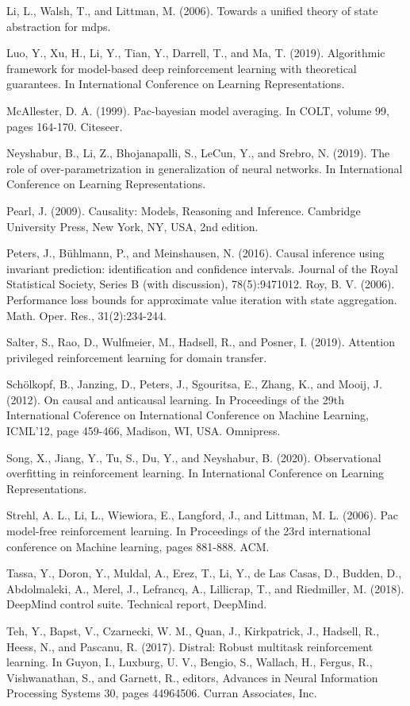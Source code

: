 \documentclass[10pt]{article}
\begin{document}
Li, L., Walsh, T., and Littman, M. (2006). Towards a unified theory of state abstraction for mdps.

Luo, Y., Xu, H., Li, Y., Tian, Y., Darrell, T., and Ma, T. (2019). Algorithmic framework for model-based deep reinforcement learning with theoretical guarantees. In International Conference on Learning Representations.

McAllester, D. A. (1999). Pac-bayesian model averaging. In COLT, volume 99, pages 164-170. Citeseer.

Neyshabur, B., Li, Z., Bhojanapalli, S., LeCun, Y., and Srebro, N. (2019). The role of over-parametrization in generalization of neural networks. In International Conference on Learning Representations.

Pearl, J. (2009). Causality: Models, Reasoning and Inference. Cambridge University Press, New York, NY, USA, 2nd edition.

Peters, J., Bühlmann, P., and Meinshausen, N. (2016). Causal inference using invariant prediction: identification and confidence intervals. Journal of the Royal Statistical Society, Series B (with discussion), 78(5):9471012. Roy, B. V. (2006). Performance loss bounds for approximate value iteration with state aggregation. Math. Oper. Res., 31(2):234-244.

Salter, S., Rao, D., Wulfmeier, M., Hadsell, R., and Posner, I. (2019). Attention privileged reinforcement learning for domain transfer.

Schölkopf, B., Janzing, D., Peters, J., Sgouritsa, E., Zhang, K., and Mooij, J. (2012). On causal and anticausal learning. In Proceedings of the 29th International Coference on International Conference on Machine Learning, ICML'12, page 459-466, Madison, WI, USA. Omnipress.

Song, X., Jiang, Y., Tu, S., Du, Y., and Neyshabur, B. (2020). Observational overfitting in reinforcement learning. In International Conference on Learning Representations.

Strehl, A. L., Li, L., Wiewiora, E., Langford, J., and Littman, M. L. (2006). Pac model-free reinforcement learning. In Proceedings of the 23rd international conference on Machine learning, pages 881-888. ACM.

Tassa, Y., Doron, Y., Muldal, A., Erez, T., Li, Y., de Las Casas, D., Budden, D., Abdolmaleki, A., Merel, J., Lefrancq, A., Lillicrap, T., and Riedmiller, M. (2018). DeepMind control suite. Technical report, DeepMind.

Teh, Y., Bapst, V., Czarnecki, W. M., Quan, J., Kirkpatrick, J., Hadsell, R., Heess, N., and Pascanu, R. (2017). Distral: Robust multitask reinforcement learning. In Guyon, I., Luxburg, U. V., Bengio, S., Wallach, H., Fergus, R., Vishwanathan, S., and Garnett, R., editors, Advances in Neural Information Processing Systems 30, pages 44964506. Curran Associates, Inc.
\end{document}
